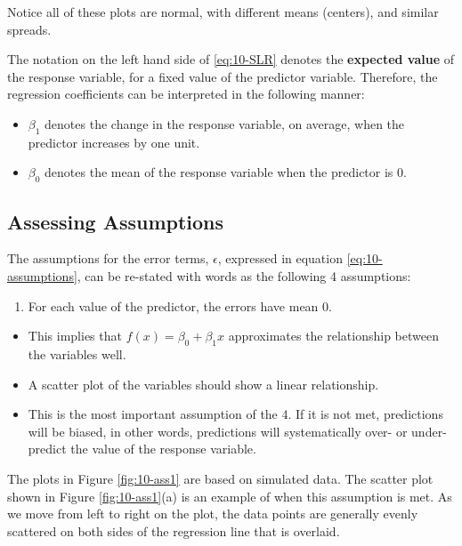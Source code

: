 \documentclass[
]{book}
\providecommand{\tightlist}{%
  \setlength{\itemsep}{0pt}\setlength{\parskip}{0pt}}
\begin{document}
Notice all of these plots are normal, with different means (centers), and similar spreads.

The notation on the left hand side of \eqref{eq:10-SLR} denotes the \textbf{expected value} of the response variable, for a fixed value of the predictor variable. Therefore, the regression coefficients can be interpreted in the following manner:

\begin{itemize}
\tightlist
\item
  \(\beta_1\) denotes the change in the response variable, on average, when the predictor increases by one unit.
\item
  \(\beta_0\) denotes the mean of the response variable when the predictor is 0.
\end{itemize}

\subsection{Assessing Assumptions}\label{assessing-assumptions}

The assumptions for the error terms, \(\epsilon\), expressed in equation \eqref{eq:10-assumptions}, can be re-stated with words as the following 4 assumptions:

\begin{enumerate}
\def\labelenumi{\arabic{enumi}.}
\tightlist
\item
  For each value of the predictor, the errors have mean 0.
\end{enumerate}

\begin{itemize}
\tightlist
\item
  This implies that \(f(x) = \beta_0 + \beta_1 x\) approximates the relationship between the variables well.
\item
  A scatter plot of the variables should show a linear relationship.
\item
  This is the most important assumption of the 4. If it is not met, predictions will be biased, in other words, predictions will systematically over- or under- predict the value of the response variable.
\end{itemize}

The plots in Figure \ref{fig:10-ass1} are based on simulated data. The scatter plot shown in Figure \ref{fig:10-ass1}(a) is an example of when this assumption is met. As we move from left to right on the plot, the data points are generally evenly scattered on both sides of the regression line that is overlaid.
\end{document}
